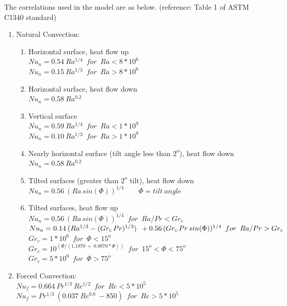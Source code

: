 The correlations used in the model are as below. (reference: Table 1 of ASTM C1340 standard)

\begin{enumerate}
   \item Natural Convection:
   \begin{enumerate}
     \item Horizontal surface, heat flow up \\
     $Nu_n = 0.54 \: Ra^{1/4} \enspace for \enspace Ra < 8 * 10^6$ \\
     $Nu_n = 0.15 \: Ra^{1/3} \enspace for \enspace Ra > 8 * 10^6$
     \item Horizontal surface, heat flow down \\
     $Nu_n = 0.58 \: Ra^{0.2}$
     \item Vertical surface \\
     $Nu_n = 0.59 \: Ra^{1/4} \enspace for \enspace Ra < 1 * 10^9$ \\
     $Nu_n = 0.10 \: Ra^{1/3} \enspace for \enspace Ra > 1 * 10^9$
     \item Nearly horizontal surface (tilt angle less than $2^o$), heat flow down \\
     $Nu_n = 0.58 \: Ra^{0.2}$
     \item Tilted surfaces (greater than $2^o$ tilt), heat flow down \\
     $Nu_n = 0.56 \: (Ra \, sin (\Phi))^{1/4} \qquad  \Phi = tilt \: angle$
     \item Tilted surfaces, heat flow up \\
     $Nu_n = 0.56 \: (Ra \, sin (\Phi))^{1/4} \enspace for \enspace Ra/Pr < Gr_c$ \\
     $Nu_n = 0.14 \: (Ra^{1/3}- (Gr_c\,Pr)^{1/3}) \\
     \enspace + 0.56\,(Gr_c \, Pr \, sin (\Phi))^{1/4} \enspace for \enspace Ra/Pr > Gr_c$ \\
     $Gr_c = 1 * 10^6 \enspace for \enspace \Phi < 15^o $ \\
     $Gr_c = 10^{(\Phi / (1.1870\:+\:0.0870*\Phi))} \enspace for \enspace 15^o < \Phi < 75^o $ \\
     $Gr_c = 5 * 10^9 \enspace for \enspace \Phi > 75^o $
   \end{enumerate}
   \item Forced Convection: \\
   $Nu_f = 0.664 \: Pr^{1/3} \: Re^{1/2} \enspace for \enspace Re < 5 * 10^5$ \\
   $Nu_f = Pr^{1/3} \: (0.037 \: Re^{0.8} \: - 850) \enspace for \enspace Re > 5 * 10^5$
\end{enumerate}

